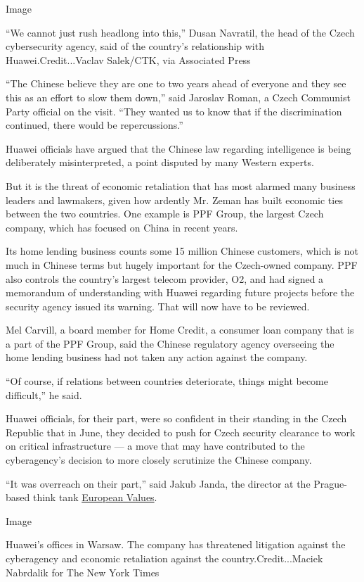 Image

``We cannot just rush headlong into this,'' Dusan Navratil, the head of
the Czech cybersecurity agency, said of the country's relationship with
Huawei.Credit...Vaclav Salek/CTK, via Associated Press

``The Chinese believe they are one to two years ahead of everyone and
they see this as an effort to slow them down,'' said Jaroslav Roman, a
Czech Communist Party official on the visit. ``They wanted us to know
that if the discrimination continued, there would be repercussions.''

Huawei officials have argued that the Chinese law regarding intelligence
is being deliberately misinterpreted, a point disputed by many Western
experts.

But it is the threat of economic retaliation that has most alarmed many
business leaders and lawmakers, given how ardently Mr. Zeman has built
economic ties between the two countries. One example is PPF Group, the
largest Czech company, which has focused on China in recent years.

Its home lending business counts some 15 million Chinese customers,
which is not much in Chinese terms but hugely important for the
Czech-owned company. PPF also controls the country's largest telecom
provider, O2, and had signed a memorandum of understanding with Huawei
regarding future projects before the security agency issued its warning.
That will now have to be reviewed.

Mel Carvill, a board member for Home Credit, a consumer loan company
that is a part of the PPF Group, said the Chinese regulatory agency
overseeing the home lending business had not taken any action against
the company.

``Of course, if relations between countries deteriorate, things might
become difficult,'' he said.

Huawei officials, for their part, were so confident in their standing in
the Czech Republic that in June, they decided to push for Czech security
clearance to work on critical infrastructure --- a move that may have
contributed to the cyberagency's decision to more closely scrutinize the
Chinese company.

``It was overreach on their part,'' said Jakub Janda, the director at
the Prague-based think tank
\href{https://www.europeanvalues.net/o-nas/nas-tym/}{European Values}.

Image

Huawei's offices in Warsaw. The company has threatened litigation
against the cyberagency and economic retaliation against the
country.Credit...Maciek Nabrdalik for The New York Times

